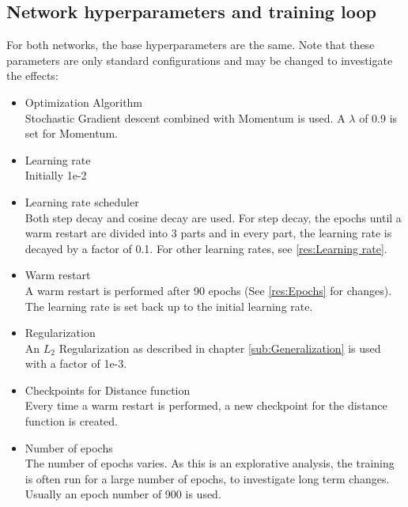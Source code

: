 \subsection{Network hyperparameters and training loop}\label{sub:Hyperparameters}
For both networks, the base hyperparameters are the same. Note that these
parameters are only standard configurations and may be changed to investigate
the effects:
\begin{itemize}
    \item Optimization Algorithm \\Stochastic Gradient descent combined with
    Momentum is used. A $\lambda$ of 0.9 is set for Momentum.
    \item Learning rate \\Initially 1e-2
    \item Learning rate scheduler \\ Both step decay and cosine decay are used.
    For step decay, the epochs until a warm restart are divided into 3 parts and
    in every part, the learning rate is decayed by a factor of 0.1. For other
    learning rates, see \ref{res:Learning rate}.
    \item Warm restart \\ A warm restart is performed after 90 epochs (See
    \ref{res:Epochs} for changes). The learning rate is set back up to the
    initial learning rate.
    \item Regularization \\An $L_2$ Regularization as described in chapter
    \ref{sub:Generalization} is used with a factor of 1e-3.
    \item Checkpoints for Distance function \\Every time a warm restart is
    performed, a new checkpoint for the distance function is created.
    \item Number of epochs \\The number of epochs varies. As this is an
    explorative analysis, the training is often run for a large number of
    epochs, to investigate long term changes. Usually an epoch number of 900 is
    used.
\end{itemize}

